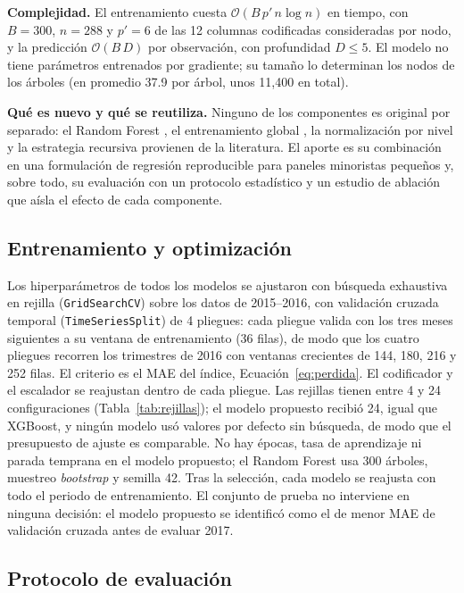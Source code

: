 \documentclass[pdflatex,sn-mathphys-num]{sn-jnl}
\begin{document}
\textbf{Complejidad.} El entrenamiento cuesta $\mathcal{O}(B\,p'\,n\log n)$ en tiempo, con $B=300$, $n=288$ y $p'=6$ de las 12 columnas codificadas consideradas por nodo, y la predicción $\mathcal{O}(B\,D)$ por observación, con profundidad $D\le5$. El modelo no tiene parámetros entrenados por gradiente; su tamaño lo determinan los nodos de los árboles (en promedio 37.9 por árbol, unos 11{,}400 en total).

\textbf{Qué es nuevo y qué se reutiliza.} Ninguno de los componentes es original por separado: el Random Forest \cite{breiman2001}, el entrenamiento global \cite{monteromanso2021}, la normalización por nivel \cite{salinas2020,smyl2020} y la estrategia recursiva \cite{taieb2012} provienen de la literatura. El aporte es su combinación en una formulación de regresión reproducible para paneles minoristas pequeños y, sobre todo, su evaluación con un protocolo estadístico y un estudio de ablación que aísla el efecto de cada componente.

\subsection{Entrenamiento y optimización}\label{subsec:entrenamiento}

Los hiperparámetros de todos los modelos se ajustaron con búsqueda exhaustiva en rejilla (\texttt{GridSearchCV}) sobre los datos de 2015--2016, con validación cruzada temporal (\texttt{TimeSeriesSplit}) de 4 pliegues: cada pliegue valida con los tres meses siguientes a su ventana de entrenamiento (36 filas), de modo que los cuatro pliegues recorren los trimestres de 2016 con ventanas crecientes de 144, 180, 216 y 252 filas. El criterio es el MAE del índice, Ecuación~\eqref{eq:perdida}. El codificador y el escalador se reajustan dentro de cada pliegue. Las rejillas tienen entre 4 y 24 configuraciones (Tabla~\ref{tab:rejillas}); el modelo propuesto recibió 24, igual que XGBoost, y ningún modelo usó valores por defecto sin búsqueda, de modo que el presupuesto de ajuste es comparable. No hay épocas, tasa de aprendizaje ni parada temprana en el modelo propuesto; el Random Forest usa 300 árboles, muestreo \emph{bootstrap} y semilla 42. Tras la selección, cada modelo se reajusta con todo el periodo de entrenamiento. El conjunto de prueba no interviene en ninguna decisión: el modelo propuesto se identificó como el de menor MAE de validación cruzada antes de evaluar 2017.

\subsection{Protocolo de evaluación}\label{subsec:evaluacion}
\end{document}
